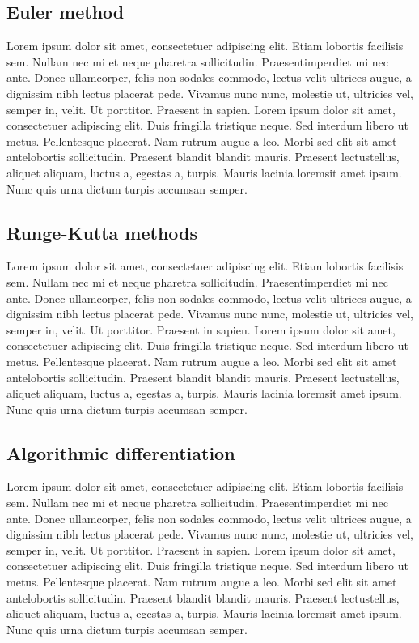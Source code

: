 \subsection{Euler method}

Lorem ipsum dolor sit amet, consectetuer adipiscing elit. Etiam lobortis facilisis sem. Nullam nec mi et neque pharetra sollicitudin. Praesentimperdiet mi nec ante. Donec ullamcorper, felis non sodales commodo, lectus velit ultrices augue, a dignissim nibh lectus placerat pede. Vivamus nunc nunc, molestie ut, ultricies vel, semper in, velit. Ut porttitor. Praesent in sapien. Lorem ipsum dolor sit amet, consectetuer adipiscing elit. Duis fringilla tristique neque. Sed interdum libero ut metus. Pellentesque placerat. Nam rutrum augue a leo. Morbi sed elit sit amet antelobortis sollicitudin. Praesent blandit blandit mauris. Praesent lectustellus, aliquet aliquam, luctus a, egestas a, turpis. Mauris lacinia loremsit amet ipsum. Nunc quis urna dictum turpis accumsan semper.

\subsection{Runge-Kutta methods}

Lorem ipsum dolor sit amet, consectetuer adipiscing elit. Etiam lobortis facilisis sem. Nullam nec mi et neque pharetra sollicitudin. Praesentimperdiet mi nec ante. Donec ullamcorper, felis non sodales commodo, lectus velit ultrices augue, a dignissim nibh lectus placerat pede. Vivamus nunc nunc, molestie ut, ultricies vel, semper in, velit. Ut porttitor. Praesent in sapien. Lorem ipsum dolor sit amet, consectetuer adipiscing elit. Duis fringilla tristique neque. Sed interdum libero ut metus. Pellentesque placerat. Nam rutrum augue a leo. Morbi sed elit sit amet antelobortis sollicitudin. Praesent blandit blandit mauris. Praesent lectustellus, aliquet aliquam, luctus a, egestas a, turpis. Mauris lacinia loremsit amet ipsum. Nunc quis urna dictum turpis accumsan semper.

\subsection{Algorithmic differentiation}

Lorem ipsum dolor sit amet, consectetuer adipiscing elit. Etiam lobortis facilisis sem. Nullam nec mi et neque pharetra sollicitudin. Praesentimperdiet mi nec ante. Donec ullamcorper, felis non sodales commodo, lectus velit ultrices augue, a dignissim nibh lectus placerat pede. Vivamus nunc nunc, molestie ut, ultricies vel, semper in, velit. Ut porttitor. Praesent in sapien. Lorem ipsum dolor sit amet, consectetuer adipiscing elit. Duis fringilla tristique neque. Sed interdum libero ut metus. Pellentesque placerat. Nam rutrum augue a leo. Morbi sed elit sit amet antelobortis sollicitudin. Praesent blandit blandit mauris. Praesent lectustellus, aliquet aliquam, luctus a, egestas a, turpis. Mauris lacinia loremsit amet ipsum. Nunc quis urna dictum turpis accumsan semper.


